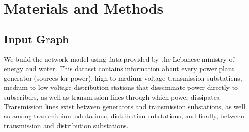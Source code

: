 
\section{Materials and Methods}
\label{methods}

\subsection{Input Graph}

We build the network model using data provided by the Lebanese ministry of energy and water. This dataset contains information about every power plant generator (sources for power), high-to medium voltage transmission substations, medium to low voltage distribution stations that disseminate power directly to subscribers, as well as transmission lines through which power dissipates. Transmission lines exist between generators and transmission substations, as well as among transmission substations, distribution substations, and finally, between transmission and distribution substations. 


